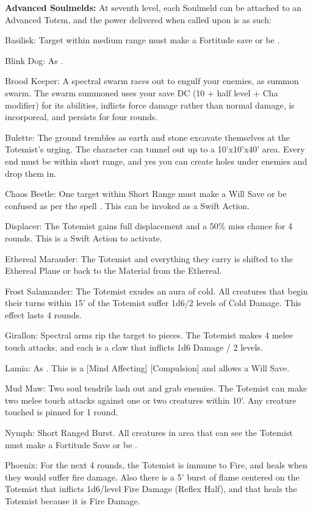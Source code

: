 \textbf{Advanced Soulmelds:} At seventh level, each Soulmeld can be attached to an Advanced Totem, and the power delivered when called upon is as such:
\begin{description*}
\item[Basilisk:] Target within medium range must make a Fortitude save or be .
\item[Blink Dog:] As .
\item[Brood Keeper:] A spectral swarm races out to engulf your enemies, as summon swarm. The swarm summoned uses your save DC (10 + half level + Cha modifier) for its abilities, inflicts force damage rather than normal damage, is incorporeal, and persists for four rounds.
\item[Bulette:] The ground trembles as earth and stone excavate themselves at the Totemist's urging. The character can tunnel out up to a 10'x10'x40' area. Every end must be within short range, and yes you can create holes under enemies and drop them in.
\item[Chaos Beetle:] One target within Short Range must make a Will Save or be confused as per the spell . This can be invoked as a Swift Action.
\item[Displacer:] The Totemist gains full displacement and a 50\% miss chance for 4 rounds. This is a Swift Action to activate.
\item[Ethereal Marauder:] The Totemist and everything they carry is shifted to the Ethereal Plane or back to the Material from the Ethereal.
\item[Frost Salamander:] The Totemist exudes an aura of cold. All creatures that begin their turns within 15' of the Totemist suffer 1d6/2 levels of Cold Damage. This effect lasts 4 rounds.
\item[Girallon:] Spectral arms rip the target to pieces. The Totemist makes 4 melee touch attacks, and each is a claw that inflicts 1d6 Damage / 2 levels.
\item[Lamia:] As . This is a [Mind Affecting] [Compulsion] and allows a Will Save.
\item[Mud Maw:] Two soul tendrils lash out and grab enemies. The Totemist can make two melee touch attacks against one or two creatures within 10'. Any creature touched is pinned for 1 round.
\item[Nymph:] Short Ranged Burst. All creatures in area that can see the Totemist must make a Fortitude Save or be .
\item[Phoenix:] For the next 4 rounds, the Totemist is immune to Fire, and heals when they would suffer fire damage. Also there is a 5' burst of flame centered on the Totemist that inflicts 1d6/level Fire Damage (Reflex Half), and that heals the Totemist because it is Fire Damage.

\end{description*}
